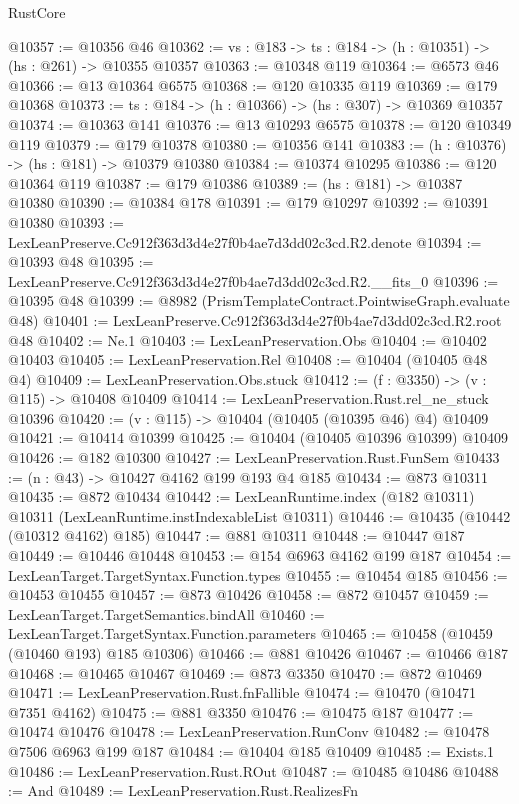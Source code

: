 \begin{lexlean}{RustCore}
\begin{coremodule}
@10357 := @10356 @46
@10362 := {vs : @183} -> {ts : @184} -> (h : @10351) -> (hs : @261) -> @10355 @10357
@10363 := @10348 @119
@10364 := @6573 @46
@10366 := @13 @10364 @6575
@10368 := @120 @10335 @119
@10369 := @179 @10368
@10373 := {ts : @184} -> (h : @10366) -> (hs : @307) -> @10369 @10357
@10374 := @10363 @141
@10376 := @13 @10293 @6575
@10378 := @120 @10349 @119
@10379 := @179 @10378
@10380 := @10356 @141
@10383 := (h : @10376) -> (hs : @181) -> @10379 @10380
@10384 := @10374 @10295
@10386 := @120 @10364 @119
@10387 := @179 @10386
@10389 := (hs : @181) -> @10387 @10380
@10390 := @10384 @178
@10391 := @179 @10297
@10392 := @10391 @10380
@10393 := LexLeanPreserve.Cc912f363d3d4e27f0b4ae7d3dd02c3cd.R2.denote
@10394 := @10393 @48
@10395 := LexLeanPreserve.Cc912f363d3d4e27f0b4ae7d3dd02c3cd.R2.__fits_0
@10396 := @10395 @48
@10399 := @8982 (PrismTemplateContract.PointwiseGraph.evaluate @48)
@10401 := LexLeanPreserve.Cc912f363d3d4e27f0b4ae7d3dd02c3cd.R2.root @48
@10402 := Ne.{1}
@10403 := LexLeanPreservation.Obs
@10404 := @10402 @10403
@10405 := LexLeanPreservation.Rel
@10408 := @10404 (@10405 @48 @4)
@10409 := LexLeanPreservation.Obs.stuck
@10412 := (f : @3350) -> (v : @115) -> @10408 @10409
@10414 := LexLeanPreservation.Rust.rel_ne_stuck @10396
@10420 := (v : @115) -> @10404 (@10405 (@10395 @46) @4) @10409
@10421 := @10414 @10399
@10425 := @10404 (@10405 @10396 @10399) @10409
@10426 := @182 @10300
@10427 := LexLeanPreservation.Rust.FunSem
@10433 := (n : @43) -> @10427 @4162 @199 @193 @4 @185
@10434 := @873 @10311
@10435 := @872 @10434
@10442 := LexLeanRuntime.index (@182 @10311) @10311 (LexLeanRuntime.instIndexableList @10311)
@10446 := @10435 (@10442 (@10312 @4162) @185)
@10447 := @881 @10311
@10448 := @10447 @187
@10449 := @10446 @10448
@10453 := @154 @6963 @4162 @199 @187
@10454 := LexLeanTarget.TargetSyntax.Function.types
@10455 := @10454 @185
@10456 := @10453 @10455
@10457 := @873 @10426
@10458 := @872 @10457
@10459 := LexLeanTarget.TargetSemantics.bindAll
@10460 := LexLeanTarget.TargetSyntax.Function.parameters
@10465 := @10458 (@10459 (@10460 @193) @185 @10306)
@10466 := @881 @10426
@10467 := @10466 @187
@10468 := @10465 @10467
@10469 := @873 @3350
@10470 := @872 @10469
@10471 := LexLeanPreservation.Rust.fnFallible
@10474 := @10470 (@10471 @7351 @4162)
@10475 := @881 @3350
@10476 := @10475 @187
@10477 := @10474 @10476
@10478 := LexLeanPreservation.RunConv
@10482 := @10478 @7506 @6963 @199 @187
@10484 := @10404 @185 @10409
@10485 := Exists.{1}
@10486 := LexLeanPreservation.Rust.ROut
@10487 := @10485 @10486
@10488 := And
@10489 := LexLeanPreservation.Rust.RealizesFn

\end{coremodule}
\end{lexlean}
